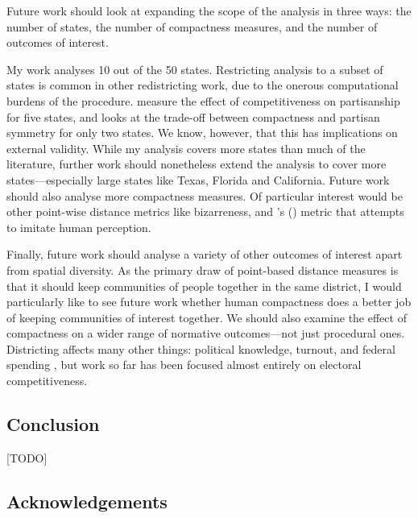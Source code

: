 \documentclass[]{article}
\begin{document}
Future work should look at expanding the scope of the analysis in three
ways: the number of states, the number of compactness measures, and the
number of outcomes of interest.

My work analyses 10 out of the 50 states. Restricting analysis to a
subset of states is common in other redistricting work, due to the
onerous computational burdens of the procedure. \cite{ddj2019comp}
measure the effect of competitiveness on partisanship for five states,
and \cite{s2020} looks at the trade-off between compactness and partisan
symmetry for only two states. We know, however, that this has
implications on external validity. While my analysis covers more states
than much of the literature, further work should nonetheless extend the
analysis to cover more states---especially large states like Texas,
Florida and California. Future work should also analyse more compactness
measures. Of particular interest would be other point-wise distance
metrics like bizarreness, and \citeauthor{kingwp}'s (\citeyear{kingwp})
metric that attempts to imitate human perception.

Finally, future work should analyse a variety of other outcomes of
interest apart from spatial diversity. As the primary draw of
point-based distance measures is that it should keep communities of
people together in the same district, I would particularly like to see
future work whether human compactness does a better job of keeping
communities of interest together. We should also examine the effect of
compactness on a wider range of normative outcomes---not just procedural
ones. Districting affects many other things: political knowledge,
turnout, and federal spending \citep{snyder2010}, but work so far has
been focused almost entirely on electoral competitiveness.

\hypertarget{conclusion}{%
\subsection{Conclusion}\label{conclusion}}

{[}TODO{]}

\hypertarget{acknowledgements}{%
\subsection{Acknowledgements}\label{acknowledgements}}
\end{document}
